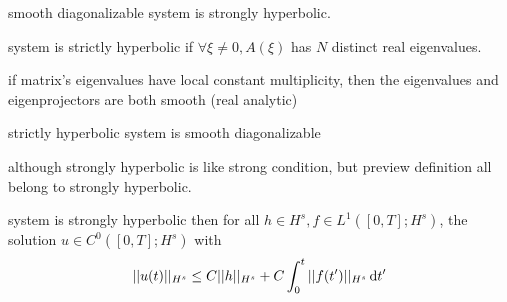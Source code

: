 \documentclass[../main]{subfiles}
\begin{document}
\begin{thm}
    smooth diagonalizable system is strongly hyperbolic.
\end{thm}
\vspace{5cm}

\begin{defn}
    system is strictly hyperbolic if $\forall \xi \neq 0,A(\xi)$ has $N$ distinct real eigenvalues.
\end{defn}
\begin{thm}
    if matrix's eigenvalues have
    local constant multiplicity, then the eigenvalues and eigenprojectors are both smooth (real analytic) 
\end{thm}
\begin{thm}
    strictly hyperbolic system is smooth diagonalizable
\end{thm}
\vspace{5cm}

\begin{rem}
    although strongly hyperbolic is like strong condition, but preview definition all belong to strongly hyperbolic.
\end{rem}

\begin{thm}
    system is strongly hyperbolic then for all $h\in H^s,f\in L^1([0,T];H^s)$, the solution $u\in C^0([0,T];H^s)$ with
    \begin{equation}
        ||u(t)||_{H^s}\le C||h||_{H^s}+C\int_0^t||f(t')||_{H^s}\,\mathrm{d}t'
    \end{equation}
\end{thm}

\newpage
\end{document}
